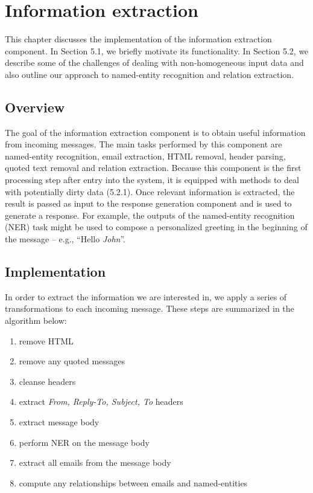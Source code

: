 \chapter{Information extraction}
This chapter discusses the implementation of the information extraction component. In Section 5.1, we briefly motivate its functionality. In Section 5.2, we describe some of the challenges of dealing with non-homogeneous input data and also outline our approach to named-entity recognition and relation extraction. 

\section{Overview}
The goal of the information extraction component is to obtain useful information from incoming messages. The main tasks performed by this component are named-entity recognition, email extraction, HTML removal, header parsing, quoted text removal and relation extraction. Because this component is the first processing step after entry into the system, it is equipped with methods to deal with potentially dirty data (5.2.1). Once relevant information is extracted, the result is passed as input to the response generation component and is used to generate a response. For example, the outputs of the named-entity recognition (NER) task might be used to compose a personalized greeting in the beginning of the message -- e.g., ``Hello \emph{John}''.

\section{Implementation}
In order to extract the information we are interested in, we apply a series of transformations to each incoming message. These steps are summarized in the algorithm below:
\begin{enumerate}
\item remove HTML %
\item remove any quoted messages %
\item cleanse headers %
\item extract \textit{From, Reply-To, Subject, To} headers %
\item extract message body %
\item perform NER on the message body %
\item extract all emails from the message body %
\item compute any relationships between emails and named-entities %
\end{enumerate}

